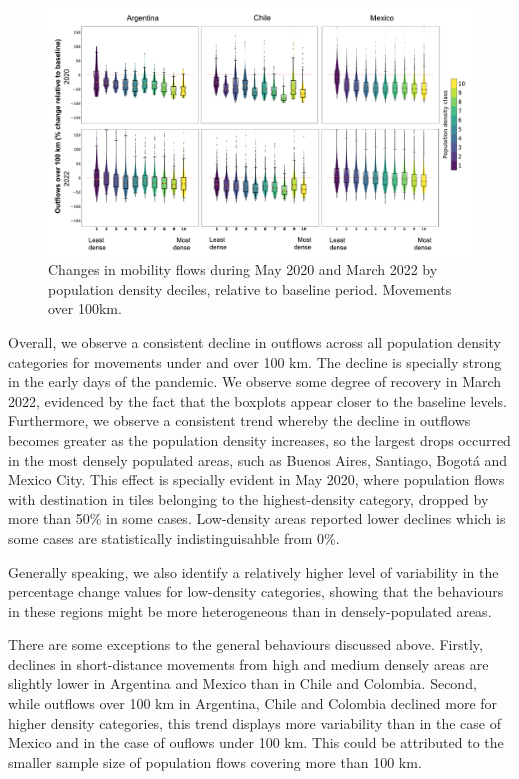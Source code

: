 \documentclass[
  10pt,
  letterpaper,
  DIV=11,
  numbers=noendperiod]{scrartcl}
\begin{document}
\begin{figure}

{\centering \includegraphics{./outputs/all_countries_outflows_o100_minus_Colombia.pdf}

}

\caption{\label{fig-outflowsO100}Changes in mobility flows during May
2020 and March 2022 by population density deciles, relative to baseline
period. Movements over 100km.}

\end{figure}

Overall, we observe a consistent decline in outflows across all
population density categories for movements under and over 100 km. The
decline is specially strong in the early days of the pandemic. We
observe some degree of recovery in March 2022, evidenced by the fact
that the boxplots appear closer to the baseline levels. Furthermore, we
observe a consistent trend whereby the decline in outflows becomes
greater as the population density increases, so the largest drops
occurred in the most densely populated areas, such as Buenos Aires,
Santiago, Bogotá and Mexico City. This effect is specially evident in
May 2020, where population flows with destination in tiles belonging to
the highest-density category, dropped by more than 50\% in some cases.
Low-density areas reported lower declines which is some cases are
statistically indistinguisahble from 0\%.

Generally speaking, we also identify a relatively higher level of
variability in the percentage change values for low-density categories,
showing that the behaviours in these regions might be more heterogeneous
than in densely-populated areas.

There are some exceptions to the general behaviours discussed above.
Firstly, declines in short-distance movements from high and medium
densely areas are slightly lower in Argentina and Mexico than in Chile
and Colombia. Second, while outflows over 100 km in Argentina, Chile and
Colombia declined more for higher density categories, this trend
displays more variability than in the case of Mexico and in the case of
ouflows under 100 km. This could be attributed to the smaller sample
size of population flows covering more than 100 km.
\end{document}
